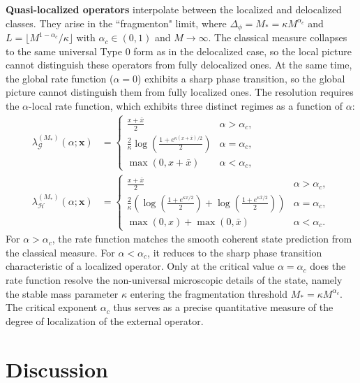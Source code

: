 \documentclass[a4paper,11pt]{article}
\theoremstyle{plain}
\theoremstyle{definition}
\theoremstyle{remark}
\newcommand{\bs}[1]{\boldsymbol{#1}}
\newcommand{\ba}{\begin{equation} \begin{aligned}}
\newcommand{\ea}{\end{aligned} \end{equation}}
\newcommand{\Df}{\Delta_\phi}
\begin{document}
\textbf{Quasi-localized operators} interpolate between the localized and delocalized classes. They arise in the ``fragmenton" limit, where $\Df = M_* = \kappa M^{\alpha_c}$ and $L = \lfloor M^{1-\alpha_c}/\kappa \rfloor$ with $\alpha_c \in (0,1)$ and $M \to \infty$. The classical measure collapses to the same universal Type 0 form as in the delocalized case, so the local picture cannot distinguish these operators from fully delocalized ones. At the same time, the global rate function ($\alpha = 0$) exhibits a sharp phase transition, so the global picture cannot distinguish them from fully localized ones. The resolution requires the $\alpha$-local rate function, which exhibits three distinct regimes as a function of $\alpha$:
\ba
\lambda^{(M_*)}_{\mathcal{G}}(\alpha;\bs{x}) &= \begin{cases}
\displaystyle \frac{x+\bar{x}}{2} & \alpha > \alpha_c, \\[10pt]
\displaystyle \frac{2}{\kappa}\log \left( \frac{1 + e^{\kappa (x+\bar{x}) / 2}}{2} \right) & \alpha = \alpha_c, \\[10pt]
\max(0,x+\bar{x}) & \alpha < \alpha_c,
\end{cases}\\[16pt]
\lambda^{(M_*)}_{\mathcal{H}}(\alpha;\bs{x}) &= \begin{cases}
\displaystyle \frac{x+\bar{x}}{2} & \alpha > \alpha_c, \\[10pt]
\displaystyle \frac{2}{\kappa}\left( \log \left( \frac{1 + e^{\kappa x / 2}}{2} \right)+\log \left( \frac{1 + e^{\kappa \bar{x} / 2}}{2} \right) \right) & \alpha = \alpha_c, \\[10pt]
\max(0,x)+\max(0,\bar{x}) & \alpha < \alpha_c.
\end{cases}
\ea
For $\alpha > \alpha_c$, the rate function matches the smooth coherent state prediction from the classical measure. For $\alpha < \alpha_c$, it reduces to the sharp phase transition characteristic of a localized operator. Only at the critical value $\alpha = \alpha_c$ does the rate function resolve the non-universal microscopic details of the state, namely the stable mass parameter $\kappa$ entering the fragmentation threshold $M_* = \kappa M^{\alpha_c}$. The critical exponent $\alpha_c$ thus serves as a precise quantitative measure of the degree of localization of the external operator.


\section{Discussion}
\label{disc}
\end{document}
